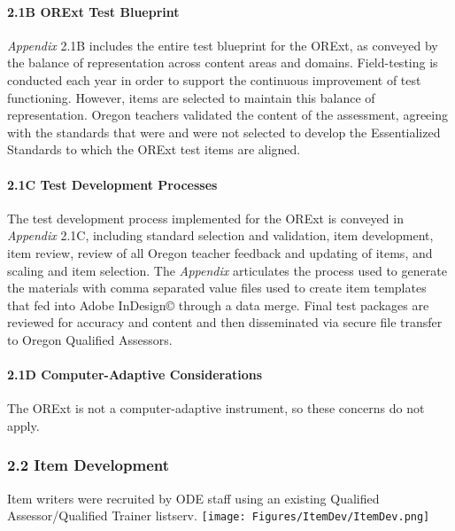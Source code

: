 \documentclass[]{article}
\let\oldparagraph\paragraph
\renewcommand{\paragraph}[1]{\oldparagraph{#1}\mbox{}}
\begin{document}
\hypertarget{b-orext-test-blueprint}{%
\paragraph{2.1B ORExt Test Blueprint}\label{b-orext-test-blueprint}}

\emph{Appendix} 2.1B includes the entire test blueprint for the ORExt,
as conveyed by the balance of representation across content areas and
domains. Field-testing is conducted each year in order to support the
continuous improvement of test functioning. However, items are selected
to maintain this balance of representation. Oregon teachers validated
the content of the assessment, agreeing with the standards that were and
were not selected to develop the Essentialized Standards to which the
ORExt test items are aligned.

\hypertarget{c-test-development-processes}{%
\paragraph{2.1C Test Development
Processes}\label{c-test-development-processes}}

The test development process implemented for the ORExt is conveyed in
\emph{Appendix} 2.1C, including standard selection and validation, item
development, item review, review of all Oregon teacher feedback and
updating of items, and scaling and item selection. The \emph{Appendix}
articulates the process used to generate the materials with comma
separated value files used to create item templates that fed into Adobe
InDesign© through a data merge. Final test packages are reviewed for
accuracy and content and then disseminated via secure file transfer to
Oregon Qualified Assessors.

\hypertarget{d-computer-adaptive-considerations}{%
\paragraph{2.1D Computer-Adaptive
Considerations}\label{d-computer-adaptive-considerations}}

The ORExt is not a computer-adaptive instrument, so these concerns do
not apply.

\hypertarget{item-development}{%
\subsubsection{2.2 Item Development}\label{item-development}}

Item writers were recruited by ODE staff using an existing Qualified
Assessor/Qualified Trainer listserv. \FloatBarrier
\texttt{[image: Figures/ItemDev/ItemDev.png]}
\end{document}
